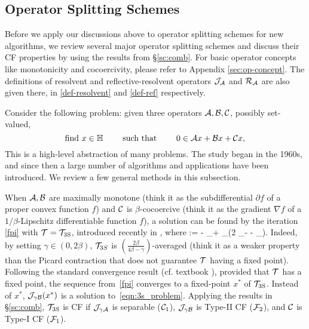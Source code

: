 \subsection{Operator Splitting Schemes}\label{sec:splitting}
Before we apply our discussions above to operator splitting schemes for new algorithms, we review several major operator splitting schemes and discuss their CF properties by using the results from \S\ref{sc:comb}. For basic operator concepts like monotonicity and cocoercivity, please refer to Appendix \ref{sec:op-concept}. The definitions of resolvent and reflective-resolvent operators ${\mathcal{J}}_{{\mathcal{A}}}$ and ${\mathcal{R}}_{{\mathcal{A}}}$ are also given there, in \eqref{def-resolvent} and \eqref{def-ref} respectively.   %

Consider the following problem: given three operators ${\mathcal{A}},{\mathcal{B}},{\mathcal{C}}$, possibly set-valued,  \begin{equation}\label{eqn:3s_problem}
\text{find } x \in \HH \qquad \text{ such that }  \qquad 0 \in \cA x + \cB x +\cC x,
\end{equation}
This is a high-level abstraction of many problems. The study began in the 1960s, and since then a large number of algorithms and applications have been introduced. We review a few general methods in this subsection.

When ${\mathcal{A}}, {\mathcal{B}}$ are maximally monotone (think it as the subdifferential $\partial f$ of a proper convex function $f$) and ${\mathcal{C}}$ is $\beta$-cocoercive (think it as the gradient $\nabla f$ of a $1/\beta$-Lipschitz differentiable function $f$),  a solution can be found by the iteration \eqref{fpi} with ${\mathcal{T}}={{\mathcal{T}}_{\mathrm{3S}}}$, introduced recently in \cite{davis2015three}, where  
\beq\label{3s}
\TS := \cI- \cJ_{\gamma \cB}+ \cJ_{\gamma \cA}\circ(2 \cJ_{\gamma \cB}- \cI - \gamma \cC\circ \cJ_{\gamma \cB}).
\eeq {}Indeed, by setting  $\gamma\in(0,2\beta)$, ${\mathcal{T}}_{3S}$ is $(\frac{2\beta}{4\beta-\gamma})$-averaged (think it as a weaker property than the Picard contraction that does not guarantee ${\mathcal{T}}$ having a fixed point). Following the standard convergence result (cf. textbook \cite{B-C2011cvx-mon}), provided that ${\mathcal{T}}$ has a  fixed point, the sequence from~\eqref{fpi} converges to a fixed-point $x^*$ of ${{\mathcal{T}}_{\mathrm{3S}}}$. Instead of $x^*$, ${\mathcal{J}}_{\gamma{\mathcal{B}}}(x^*)$ is a solution to~\eqref{eqn:3s_problem}.  
Applying the results in \S\ref{sc:comb},  ${{\mathcal{T}}_{\mathrm{3S}}}$ {is CF if } ${\mathcal{J}}_{\gamma {\mathcal{A}}}$ is separable (${\mathcal{C}}_1$), ${\mathcal{J}}_{\gamma {\mathcal{B}}}$ is Type-II CF (${\mathcal{F}}_2$), and ${\mathcal{C}}$ is Type-I CF (${\mathcal{F}}_1$). %

